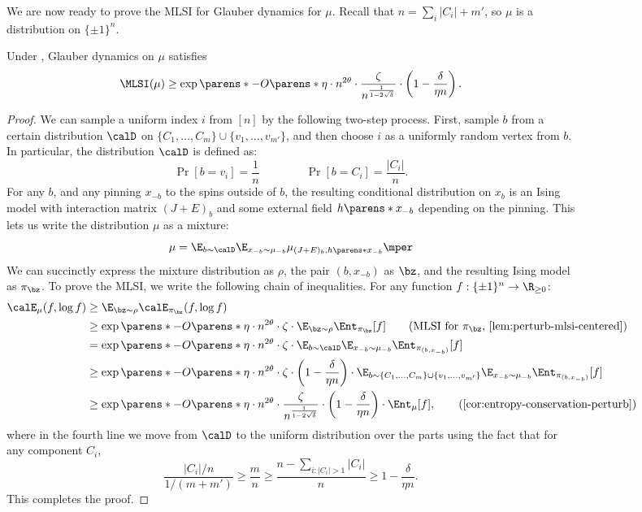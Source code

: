 \documentclass[11pt,letterpaper]{article}
\begin{document}
\begin{figure}
\begin{figure}
We are now ready to prove the MLSI for Glauber dynamics for $\mu$. Recall that $n = \sum_{i}|C_i| + m'$, so $\mu$ is a distribution on $\{\pm1\}^n$.
\begin{lemma}\label{lem:mlsi-under-assumptions}
    Under , Glauber dynamics on $\mu$ satisfies
    \[
        \MLSI(\mu) \ge \exp\parens*{-O\parens*{\eta \cdot n^{2\theta}}} \cdot \frac{\zeta}{n^{\frac{1}{1-2\sqrt{\delta}}}} \cdot \left(1 - \frac{\delta}{\eta n}\right).
    \]
\end{lemma}
\begin{proof}
    We can sample a uniform index $i$ from $[n]$ by the following two-step process. First, sample $b$ from a certain distribution $\calD$ on $\{C_1,\dots,C_m\}\cup\{v_1,\dots,v_{m'}\}$, and then choose $i$ as a uniformly random vertex from $b$. In particular, the distribution $\calD$ is defined as:
    \[
        \Pr[b = v_i] = \frac{1}{n} \qquad \qquad \Pr[b = C_i] = \frac{|C_i|}{n}.
    \]
    For any $b$, and any pinning $x_{-b}$ to the spins outside of $b$, the resulting conditional distribution on $x_b$ is an Ising model with interaction matrix $(J+E)_b$ and some external field $h\parens*{x_{-b}}$ depending on the pinning.
    This lets us write the distribution $\mu$ as a mixture:
    \[
        \mu = \E_{b\sim\calD} \E_{x_{-b}\sim\mu_{-b}} \mu_{(J+E)_b, h\parens*{x_{-b}}}\mper
    \]
    We can succinctly express the mixture distribution as $\rho$, the pair $(b, x_{-b})$ as $\bz$, and the resulting Ising model as $\pi_{\bz}$.
    To prove the MLSI, we write the following chain of inequalities.
    For any function $f:\{\pm1\}^n\to\R_{\ge 0}$:
    \begin{align*}
        \calE_{\mu}(f, \log f) &\ge \E_{\bz\sim\rho} \calE_{\pi_{\bz}}(f, \log f) \\
        &\ge \exp\parens*{-O\parens*{\eta \cdot n^{2\theta}}} \cdot \zeta \cdot \E_{\bz\sim\rho} \Ent_{\pi_{\bz}}[f] \tag*{\text{(MLSI for $\pi_{\bz}$, \Cref{lem:perturb-mlsi-centered})}}\\
        &= \exp\parens*{-O\parens*{\eta \cdot n^{2\theta}}} \cdot \zeta \cdot \E_{b\sim\calD} \E_{x_{-b}\sim\mu_{-b}} \Ent_{\pi_{(b,x_{-b})}}[f] \\
        &\ge \exp\parens*{-O\parens*{\eta \cdot n^{2\theta}}} \cdot \zeta \cdot \left(1 - \frac{\delta}{\eta n}\right) \cdot \E_{b\sim\{C_1,\dots,C_m\}\cup\{v_1,\dots,v_{m'}\}} \E_{x_{-b}\sim\mu_{-b}} \Ent_{\pi_{(b,x_{-b})}}[f] \\
        &\ge \exp\parens*{-O\parens*{\eta \cdot n^{2\theta}}} \cdot \frac{\zeta}{n^{\frac{1}{1-2\sqrt{\delta}}}} \cdot \left(1 - \frac{\delta}{\eta n}\right) \cdot \Ent_{\mu}[f],  \tag*{(\Cref{cor:entropy-conservation-perturb})}
    \end{align*}
    where in the fourth line we move from $\calD$ to the uniform distribution over the parts using the fact that for any component $C_i$,
    \[ \frac{|C_i|/n}{1/(m+m')} \ge \frac{m}{n} \ge \frac{n - \sum_{i : |C_i| > 1} |C_i|}{n} \ge 1 - \frac{\delta}{\eta n}. \]
    This completes the proof.
\end{proof}


\end{figure}
\end{figure}
\end{document}
